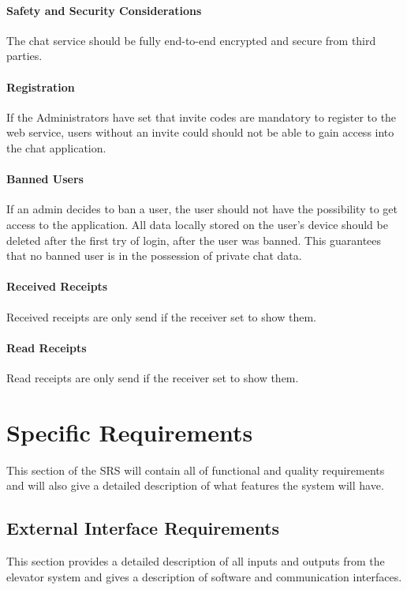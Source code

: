 \paragraph{Safety and Security Considerations}
The chat service should be fully end-to-end encrypted and secure from third parties.

\paragraph{Registration}
If the Administrators have set that invite codes are mandatory to register to the web service, users without an invite
could should not be able to gain access into the chat application.

\paragraph{Banned Users}
If an admin decides to ban a user, the user should not have the possibility to get access to the application.
All data locally stored on the user’s device should be deleted after the first try of login, after the user was banned.
This guarantees that no banned user is in the possession of private chat data.

\paragraph{Received Receipts}
Received receipts are only send if the receiver set to show them.

\paragraph{Read Receipts}
Read receipts are only send if the receiver set to show them.

\section{Specific Requirements}\label{sec:specific-requirements}
This section of the SRS will contain all of functional and quality requirements and will also give a detailed
description of what features the system will have.

\subsection{External Interface Requirements}\label{subsec:external-interface-requirements}
This section provides a detailed description of all inputs and outputs from the elevator system and gives a description
of software and communication interfaces.

